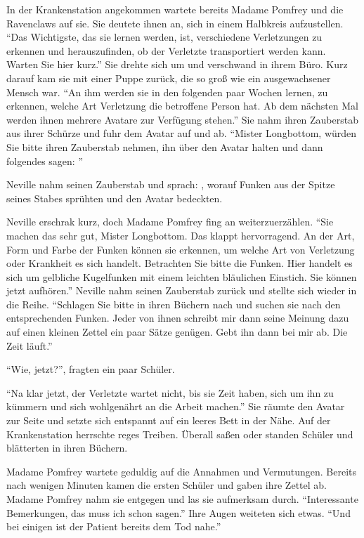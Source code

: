 In der Krankenstation angekommen wartete bereits Madame Pomfrey und die Ravenclaws auf sie. Sie deutete ihnen an, sich in einem Halbkreis aufzustellen. \enquote{Das Wichtigste, das sie lernen werden, ist, verschiedene Verletzungen zu erkennen und herauszufinden, ob der Verletzte transportiert werden kann. Warten Sie hier kurz.} Sie drehte sich um und verschwand in ihrem Büro. Kurz darauf kam sie mit einer Puppe zurück, die so groß wie ein ausgewachsener Mensch war. \enquote{An ihm werden sie in den folgenden paar Wochen lernen, zu erkennen, welche Art Verletzung die betroffene Person hat. Ab dem nächsten Mal werden ihnen mehrere Avatare zur Verfügung stehen.} Sie nahm ihren Zauberstab aus ihrer Schürze und fuhr dem Avatar auf und ab. \enquote{Mister Longbottom, würden Sie bitte ihren Zauberstab nehmen, ihn über den Avatar halten und dann folgendes sagen: }

Neville nahm seinen Zauberstab und sprach: , worauf Funken aus der Spitze seines Stabes sprühten und den Avatar bedeckten.

Neville erschrak kurz, doch Madame Pomfrey fing an weiterzuerzählen. \enquote{Sie machen das sehr gut, Mister Longbottom. Das klappt hervorragend. \gst An der Art, Form und Farbe der Funken können sie erkennen, um welche Art von Verletzung oder Krankheit es sich handelt. \gst Betrachten Sie bitte die Funken. Hier handelt es sich um gelbliche Kugelfunken mit einem leichten bläulichen Einstich. \gst Sie können jetzt aufhören.} Neville nahm seinen Zauberstab zurück und stellte sich wieder in die Reihe. \enquote{Schlagen Sie bitte in ihren Büchern nach und suchen sie nach den entsprechenden Funken. Jeder von ihnen schreibt mir dann seine Meinung dazu auf einen kleinen Zettel \gst ein paar Sätze genügen. Gebt ihn dann bei mir ab. Die Zeit läuft.}

\enquote{Wie, jetzt?}, fragten ein paar Schüler.

\enquote{Na klar jetzt, der Verletzte wartet nicht, bis sie Zeit haben, sich um ihn zu kümmern und sich wohlgenährt an die Arbeit machen.} Sie räumte den Avatar zur Seite und setzte sich entspannt auf ein leeres Bett in der Nähe. Auf der Krankenstation herrschte reges Treiben. Überall saßen oder standen Schüler und blätterten in ihren Büchern.

Madame Pomfrey wartete geduldig auf die Annahmen und Vermutungen. Bereits nach wenigen Minuten kamen die ersten Schüler und gaben ihre Zettel ab. Madame Pomfrey nahm sie entgegen und las sie aufmerksam durch. \enquote{Interessante Bemerkungen, das muss ich schon sagen.} Ihre Augen weiteten sich etwas. \enquote{Und bei einigen ist der Patient bereits dem Tod nahe.}

